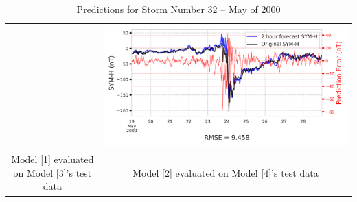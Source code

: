 \documentclass[draft,sw]{agutexSI2019}
\begin{document}
\begin{table}
\begin{tabular}{cc}
&
\includegraphics[width=0.49\linewidth]{paper_plots/2h_swics_model_on_no_swics/2h_swics_model_on_no_swics_storm_32.png}
\\
Model [1] evaluated on Model [3]'s test data & Model [2] evaluated on Model [4]'s test data
\vspace*{12pt}
\\
\end{tabular}
\caption{Predictions for Storm Number 32 -- May of 2000}
\label{storm-32}
\end{table}
\end{document}
